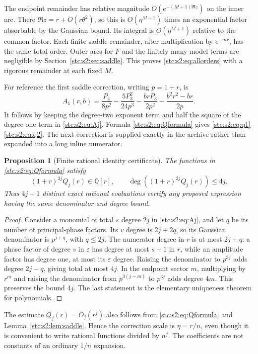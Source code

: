 \documentclass[11pt,letterpaper]{article}
\numberwithin{equation}{section}
\newtheorem{proposition}[theorem]{Proposition}
\theoremstyle{remark}\newtheorem{remark}[theorem]{Remark}
\newcommand{\eps}{\varepsilon}
\begin{document}
The endpoint remainder has relative magnitude $O(e^{-(M+1)\Re z})$ on the inner arc. There $\Re z=r+O(r\theta^2)$, so this is $O(\eta^{M+1})$ times an exponential factor absorbable by the Gaussian bound. Its integral is $O(\eta^{M+1})$ relative to the common factor. Each finite saddle remainder, after multiplication by $e^{-mr}$, has the same total order. Outer arcs for $F$ and the finitely many model terms are negligible by Section~\ref{stc:s2:sec:saddle}. This proves \eqref{stc:s2:eq:allorders} with a rigorous remainder at each fixed $M$.

For reference the first saddle correction, writing $p=1+r$, is
\begin{equation}\label{stc:s2:eq:A1}
 A_1(r,b)=\frac{P_4}{8p^2}-\frac{5P_3^2}{24p^3}
 -\frac{brP_3}{2p^2}-\frac{b^2r^2-br}{2p}.
\end{equation}
It follows by keeping the degree-two exponent term and half the square of the degree-one term in \eqref{stc:s2:eq:Aj}. Formula \eqref{stc:s2:eq:Qformula} gives \eqref{stc:s2:eq:q1}--\eqref{stc:s2:eq:q2}. The next correction is supplied exactly in the archive rather than expanded into a long inline numerator.

\begin{proposition}[Finite rational identity certificate]\label{stc:s2:prop:degree}
The functions in \eqref{stc:s2:eq:Qformula} satisfy
\[
 (1+r)^{3j}Q_j(r)\in\mathbb Q[r],\qquad
 \deg((1+r)^{3j}Q_j(r))\le4j.
\]
Thus $4j+1$ distinct exact rational evaluations certify any proposed expression having the same denominator and degree bound.
\end{proposition}
\begin{proof}
Consider a monomial of total $\eps$ degree $2j$ in \eqref{stc:s2:eq:Aj}, and let $q$ be its number of principal-phase factors. Its $v$ degree is $2j+2q$, so its Gaussian denominator is $p^{j+q}$, with $q\le2j$. The numerator degree in $r$ is at most $2j+q$: a phase factor of degree $s$ in $\eps$ has degree at most $s+1$ in $r$, while an amplitude factor has degree one, at most its $\eps$ degree. Raising the denominator to $p^{3j}$ adds degree $2j-q$, giving total at most $4j$. In the endpoint sector $m$, multiplying by $r^m$ and raising the denominator from $p^{3(j-m)}$ to $p^{3j}$ adds degree $4m$. This preserves the bound $4j$. The last statement is the elementary uniqueness theorem for polynomials.
\end{proof}

The estimate $Q_j(r)=O_j(r^j)$ also follows from \eqref{stc:s2:eq:Qformula} and Lemma~\ref{stc:s2:lem:saddle}. Hence the correction scale is $\eta=r/n$, even though it is convenient to write rational functions divided by $n^j$. The coefficients are not constants of an ordinary $1/n$ expansion.
\end{document}
